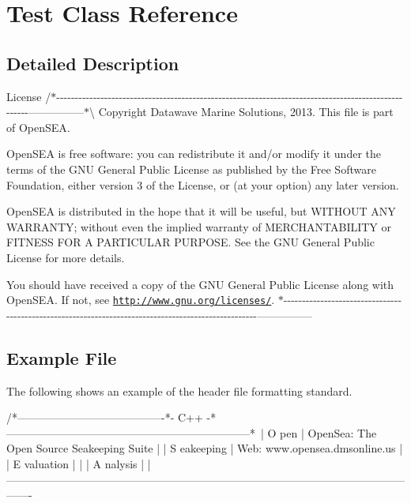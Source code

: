 \hypertarget{class_test}{\section{Test Class Reference}
\label{class_test}
}


\subsection{Detailed Description}
License /$\ast$-\/-\/-\/-\/-\/-\/-\/-\/-\/-\/-\/-\/-\/-\/-\/-\/-\/-\/-\/-\/-\/-\/-\/-\/-\/-\/-\/-\/-\/-\/-\/-\/-\/-\/-\/-\/-\/-\/-\/-\/-\/-\/-\/-\/-\/-\/-\/-\/-\/-\/-\/-\/-\/-\/-\/-\/-\/-\/-\/-\/-\/-\/-\/-\/-\/-\/-\/-\/-\/-\/-\/-\/-\/-\/-\/-\/-\/-\/-\/-\/-\/-\/-\/-\/-\/-\/-\/-\/-\/-\/-\/-\/-\/-\/-\/-\/-\/-\/-\/-\/---------------$\ast$\textbackslash{} Copyright Datawave Marine Solutions, 2013. This file is part of Open\-S\-E\-A.

Open\-S\-E\-A is free software\-: you can redistribute it and/or modify it under the terms of the G\-N\-U General Public License as published by the Free Software Foundation, either version 3 of the License, or (at your option) any later version.

Open\-S\-E\-A is distributed in the hope that it will be useful, but W\-I\-T\-H\-O\-U\-T A\-N\-Y W\-A\-R\-R\-A\-N\-T\-Y; without even the implied warranty of M\-E\-R\-C\-H\-A\-N\-T\-A\-B\-I\-L\-I\-T\-Y or F\-I\-T\-N\-E\-S\-S F\-O\-R A P\-A\-R\-T\-I\-C\-U\-L\-A\-R P\-U\-R\-P\-O\-S\-E. See the G\-N\-U General Public License for more details.

You should have received a copy of the G\-N\-U General Public License along with Open\-S\-E\-A. If not, see \href{http://www.gnu.org/licenses/}{\tt http\-://www.\-gnu.\-org/licenses/}. $\ast$-\/-\/-\/-\/-\/-\/-\/-\/-\/-\/-\/-\/-\/-\/-\/-\/-\/-\/-\/-\/-\/-\/-\/-\/-\/-\/-\/-\/-\/-\/-\/-\/-\/-\/-\/-\/-\/-\/-\/-\/-\/-\/-\/-\/-\/-\/-\/-\/-\/-\/-\/-\/-\/-\/-\/-\/-\/-\/-\/-\/-\/-\/-\/-\/-\/-\/-\/-\/-\/-\/-\/-\/-\/-\/-\/-\/-\/-\/-\/-\/-\/-\/-\/-\/-\/-\/-\/-\/-\/-\/-\/-\/-\/-\/-\/-\/-\/-\/-\/-\/---------------\hypertarget{class_test_examplefile}{}\subsection{Example File}\label{class_test_examplefile}
The following shows an example of the header file formatting standard.

\begin{DoxyVerb}  /*----------------------------------------*- C++ -*------------------------------------------------------------------*\
  | O pen         | OpenSea: The Open Source Seakeeping Suite                                                           |
  | S eakeeping   | Web:     www.opensea.dmsonline.us                                                                   |
  | E valuation   |                                                                                                     |
  | A nalysis     |                                                                                                     |
  \*------------------------------------------------------------------------------------------------------------------- \end{DoxyVerb}


